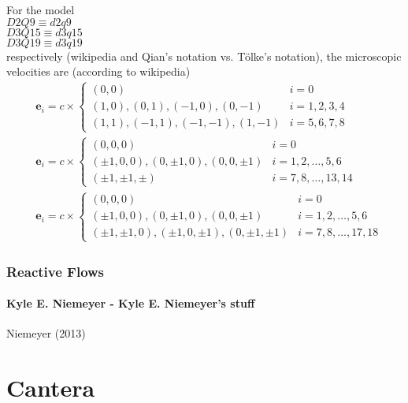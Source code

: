 \documentclass[10pt]{amsart}
\begin{document}
\begin{multicols*}{2}
For the model \\
$D2Q9 \equiv d2q9$ \\
$D3Q15 \equiv d3q15$ \\
$D3Q19 \equiv d3q19$ \\
respectively (wikipedia and Qian's notation vs. T\"{o}lke's notation), the microscopic velocities are (according to wikipedia)
\begin{equation}
\begin{aligned}
&  \mathbf{e}_i = c \times \begin{cases} (0,0) & i = 0 \\
    (1,0),(0,1),(-1,0),(0,-1) & i = 1,2,3,4 \\
    (1,1),(-1,1), (-1,-1), (1,-1) & i = 5,6,7,8 \end{cases} \\
&  \mathbf{e}_i = c \times \begin{cases} (0,0,0) & i = 0 \\
    (\pm 1,0,0), (0, \pm 1, 0), (0,0,\pm 1) & i = 1,2, \dots, 5,6 \\
    (\pm 1, \pm 1, \pm ) & i = 7,8, \dots, 13,14 \end{cases} \\
&  \mathbf{e}_i = c \times \begin{cases} (0,0,0) & i = 0 \\
    (\pm 1, 0, 0) , (0, \pm 1, 0), (0,0 , \pm 1) & i = 1,2, \dots , 5, 6 \\
    (\pm 1, \pm 1 ,0), (\pm 1, 0, \pm 1), (0, \pm 1, \pm 1) & i = 7, 8 , \dots, 17, 18 \end{cases}
  \end{aligned}
  \end{equation}



\section{Reactive Flows}

\subsection{Kyle E. Niemeyer - Kyle E. Niemeyer's stuff}

Niemeyer (2013) \cite{NiSu2013}



\part{Cantera}


\end{multicols*}
\end{document}
